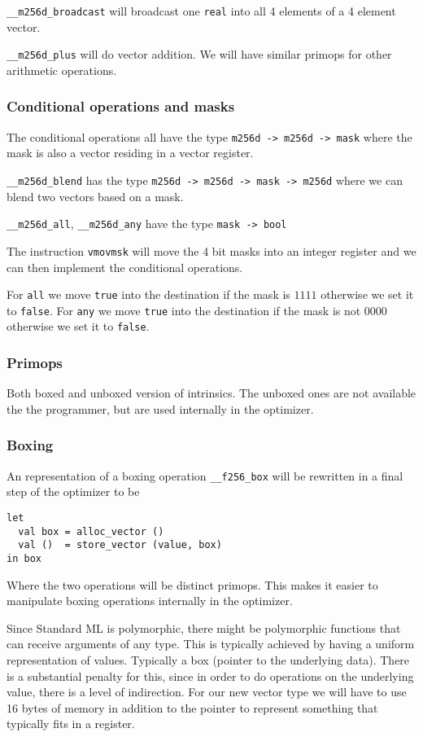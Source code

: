 \documentclass{article}
\begin{document}
\verb!__m256d_broadcast! will broadcast one \verb!real! into all 4 elements of a 4 element vector.

\verb!__m256d_plus! will do vector addition. We will have similar primops for other arithmetic operations.

\subsubsection{Conditional operations and masks}

The conditional operations all have the type \verb!m256d -> m256d -> mask! where the mask is also a vector residing in a vector register.

\verb!__m256d_blend! has the type \verb!m256d -> m256d -> mask -> m256d! where we can blend two vectors based on a mask.

\verb!__m256d_all!, \verb!__m256d_any! have the type \verb!mask -> bool!

The instruction \verb!vmovmsk! will move the 4 bit masks into an integer register and we can then implement the conditional operations.

For \verb!all! we move \verb!true! into the destination if the mask is $1111$ otherwise we set it to \verb!false!.
For \verb!any! we move \verb!true! into the destination if the mask is not $0000$ otherwise we set it to \verb!false!.

\subsubsection{Primops}

Both boxed and unboxed version of intrinsics. The unboxed ones are not available the the programmer, but are used internally in the optimizer.

\subsubsection{Boxing}

An representation of a boxing operation \verb!__f256_box! will be rewritten in a final step of the optimizer to be
\begin{lstlisting}
let
  val box = alloc_vector ()
  val ()  = store_vector (value, box)
in box
\end{lstlisting}
Where the two operations will be distinct primops. This makes it easier to manipulate boxing operations internally in the optimizer.

Since Standard ML is polymorphic, there might be polymorphic functions that can receive arguments of any type. This is typically achieved by having a uniform representation of values. Typically a box (pointer to the underlying data). There is a substantial penalty for this, since in order to do operations on the underlying value, there is a level of indirection. For our new vector type we will have to use 16 bytes of memory in addition to the pointer to represent something that typically fits in a register.
\end{document}
